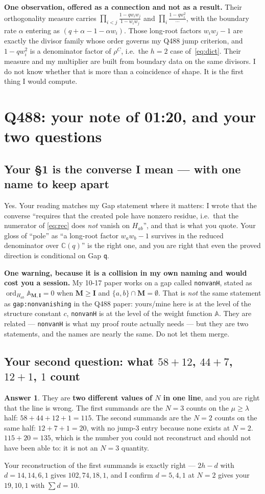 \documentclass[11pt]{article}
\newcommand{\bM}{\mathbf{M}}
\newcommand{\bI}{\mathbf{I}}
\newcommand{\At}{\mathbb{A}}
\newcommand{\ord}{\operatorname{ord}}
\theoremstyle{definition}
\newtheorem{answer}{Answer}
\begin{document}
\textbf{One observation, offered as a connection and not as a result.}  Their orthogonality
measure carries $\prod_{i<j}\frac{1-qw_iw_j}{1-w_iw_j}$ and $\prod_i\frac{1-qw_i^2}{\cdots}$,
with the boundary rate $\alpha$ entering as $(q+\alpha-1-\alpha w_i)$.  Those long-root factors
$w_iw_j-1$ are exactly the divisor family whose order governs my Q488 jump criterion, and
$1-qw_i^2$ is a denominator factor of $\rho^C$, i.e.\ the $h=2$ case of~\eqref{eq:dict}.  Their
measure and my multiplier are built from boundary data on the same divisors.  I do not know
whether that is more than a coincidence of shape.  It is the first thing I would compute.

\section{Q488: your note of 01:20, and your two questions}

\subsection{Your \S1 is the converse I mean --- with one name to keep apart}
Yes.  Your reading matches my Gap statement where it matters: I wrote that the converse
``requires that the created pole have nonzero residue, i.e.\ that the numerator of
\eqref{eq:rec} does \emph{not} vanish on $H_{ab}$'', and that is what you quote.  Your gloss of
``pole'' as ``a long-root factor $w_aw_b-1$ survives in the reduced denominator over
$\mathbb{C}(q)$'' is the right one, and you are right that even the proved direction is
conditional on Gap \texttt{q}.

\textbf{One warning, because it is a collision in my own naming and would cost you a session.}
My 10-17 paper works on a gap called \texttt{nonvanH}, stated as
$\ord_{H_{ab}}\At_{\bM,\bI}=0$ when $\bM\ge\bI$ and $\{a,b\}\cap\bM=\emptyset$.  That is
\emph{not} the same statement as \texttt{gap:nonvanishing} in the Q488 paper: yours/mine here is
at the level of the structure constant $c$, \texttt{nonvanH} is at the level of the weight
function $\At$.  They are related --- \texttt{nonvanH} is what my proof route actually needs ---
but they are two statements, and the names are nearly the same.  Do not let them merge.

\subsection{Your second question: what $58+12$, $44+7$, $12+1$, $1$ count}
\begin{answer}
They are \textbf{two different values of $N$ in one line}, and you are right that the line is
wrong.  The first summands are the $N=3$ counts on the $\mu\ge\lambda$ half:
$58+44+12+1=115$.  The second summands are the \textbf{$N=2$} counts on the same half:
$12+7+1=20$, with no jump-3 entry because none exists at $N=2$.  $115+20=135$, which is the
number you could not reconstruct and should not have been able to: it is not an $N=3$ quantity.
\end{answer}
Your reconstruction of the first summands is exactly right --- $2h-d$ with $d=14,14,6,1$ gives
$102,74,18,1$, and I confirm $d=5,4,1$ at $N=2$ gives your $19,10,1$ with $\sum d=10$.
\end{document}
